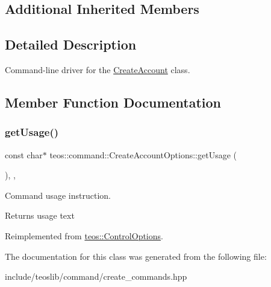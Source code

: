 \subsection*{Additional Inherited Members}


\subsection{Detailed Description}
Command-\/line driver for the \mbox{\hyperlink{classteos_1_1command_1_1_create_account}{Create\+Account}} class. 

\subsection{Member Function Documentation}
\mbox{\label{classteos_1_1command_1_1_create_account_options_af5c13799a676966824e5e9e47b1af180}} 
\subsubsection{\texorpdfstring{get\+Usage()}{getUsage()}}
{\footnotesize\ttfamily const char$\ast$ teos\+::command\+::\+Create\+Account\+Options\+::get\+Usage (\begin{DoxyParamCaption}{ }\end{DoxyParamCaption})\hspace{0.3cm}{\ttfamily [inline]}, {\ttfamily [protected]}, {\ttfamily [virtual]}}



Command \textquotesingle{}usage\textquotesingle{} instruction. 

\begin{DoxyReturn}{Returns}
usage text 
\end{DoxyReturn}


Reimplemented from \mbox{\hyperlink{classteos_1_1_control_options_a0aa5671f9bc750ed5280c26c543874f3}{teos\+::\+Control\+Options}}.



The documentation for this class was generated from the following file\+:\begin{DoxyCompactItemize}
\item 
include/teoslib/command/create\+\_\+commands.\+hpp\end{DoxyCompactItemize}
